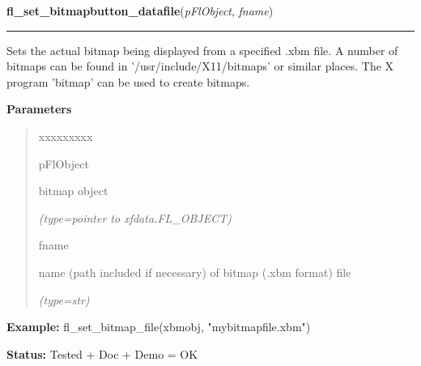 \hspace{.8\funcindent}\begin{boxedminipage}{\funcwidth}

    \raggedright \textbf{fl\_set\_bitmapbutton\_datafile}(\textit{pFlObject}, \textit{fname})

    \vspace{-1.5ex}

    \rule{\textwidth}{0.5\fboxrule}
\setlength{\parskip}{2ex}
    Sets the actual bitmap being displayed from a specified .xbm file. A 
    number of bitmaps can be found in '/usr/include/X11/bitmaps' or similar
    places. The X program 'bitmap' can be used to create bitmaps.

\setlength{\parskip}{1ex}
      \textbf{Parameters}
      \vspace{-1ex}

      \begin{quote}
        \begin{Ventry}{xxxxxxxxx}

          \item[pFlObject]

          bitmap object

            {\it (type=pointer to xfdata.FL\_OBJECT)}

          \item[fname]

          name (path included if necessary) of bitmap (.xbm format) file

            {\it (type=str)}

        \end{Ventry}

      \end{quote}

\textbf{Example:} fl\_set\_bitmap\_file(xbmobj, "mybitmapfile.xbm")



\textbf{Status:} Tested + Doc + Demo = OK



    \end{boxedminipage}

    \label{xformslib:flbitmap:fl_read_bitmapfile}

    \vspace{0.5ex}

